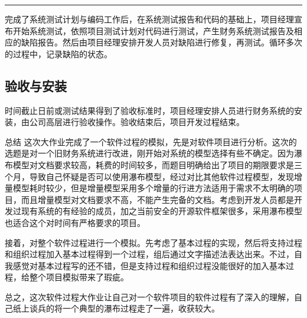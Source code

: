 \documentclass[UTF8,nofonts]{ctexart}
\makeatletter
\renewcommand{\section}{\@startsection{section}{1}{0mm}
  {-\baselineskip}{0.5\baselineskip}{\fontsize{16pt}{16pt}\bf\leftline}}
\makeatother
\begin{document}
\noindent\rule[0.25\baselineskip]{\textwidth}{2pt}

完成了系统测试计划与编码工作后，在系统测试报告和代码的基础上，项目经理宣布开始系统测试，依照项目测试计划对代码进行测试，产生财务系统测试报告及相应的缺陷报告。然后由项目经理安排开发人员对缺陷进行修复，再测试。循环多次的过程中，记录缺陷的状态。
\subsection{验收与安装} %
\label{sub:验收与安装_}
时间截止日前或测试结果得到了验收标准时，项目经理安排人员进行财务系统的安装，由公司高层进行验收操作。验收结束后，项目开发过程结束。
\section{总结}
\label{sub:总结_}
这次大作业完成了一个软件过程的模拟，先是对软件项目进行分析。这次的选题是对一个旧财务系统进行改进，刚开始对系统的模型选择有些不确定。因为瀑布模型对文档要求较高，耗费的时间较多，而题目明确给出了项目的期限要求是三个月，导致自己怀疑是否可以使用瀑布模型，经过对比其他软件过程模型，发现增量模型耗时较少，但是增量模型采用多个增量的行进方法适用于需求不太明确的项目，而且增量模型对文档要求不高，不能产生完备的文档。考虑到开发人员都是开发过现有系统的有经验的成员，加之当前安全的开源软件框架很多，采用瀑布模型也适合这个对时间有严格要求的项目。

接着，对整个软件过程进行一个模拟。先考虑了基本过程的实现，然后将支持过程和组织过程加入基本过程得到一个过程，组后通过文字描述法表达出来。不过，自我感觉对基本过程写的还不错，但是支持过程和组织过程没能很好的加入基本过程，给整个项目模拟带来了瑕疵。

总之，这次软件过程大作业让自己对一个软件项目的软件过程有了深入的理解，自己纸上谈兵的将一个典型的瀑布过程走了一遍，收获较大。
\end{document}
